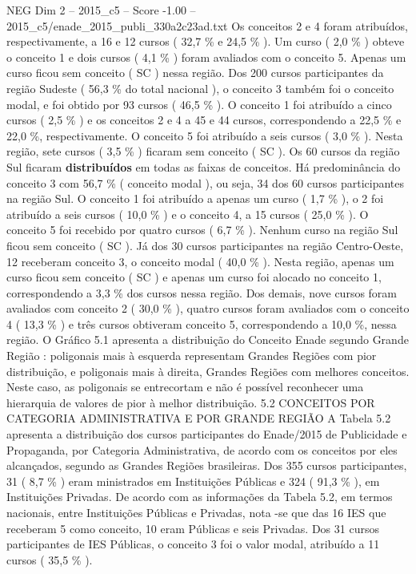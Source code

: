 \begin{textsample}{NEG Dim 2 – 2015\_c5 – Score -1.00 – 2015\_c5/enade\_2015\_publi\_330a2c23ad.txt}
Os conceitos 2 e 4 foram atribuídos, respectivamente, a 16 e 12 cursos ( 32,7 \% e 24,5 \% ).
Um curso ( 2,0 \% ) obteve o conceito 1 e dois cursos ( 4,1 \% ) foram avaliados com o conceito 5.
Apenas um curso ficou sem conceito ( SC ) nessa região.
Dos 200 cursos participantes da região Sudeste ( 56,3 \% do total nacional ), o conceito 3 também foi o conceito modal, e foi obtido por 93 cursos ( 46,5 \% ).
O conceito 1 foi atribuído a cinco cursos ( 2,5 \% ) e os conceitos 2 e 4 a 45 e 44 cursos, correspondendo a 22,5 \% e 22,0 \%, respectivamente.
O conceito 5 foi atribuído a seis cursos ( 3,0 \% ).
Nesta região, sete cursos ( 3,5 \% ) ficaram sem conceito ( SC ).
Os 60 cursos da região Sul ficaram \textbf{distribuídos} em todas as faixas de conceitos.
Há predominância do conceito 3 com 56,7 \% ( conceito modal ), ou seja, 34 dos 60 cursos participantes na região Sul.
O conceito 1 foi atribuído a apenas um curso ( 1,7 \% ), o 2 foi atribuído a seis cursos ( 10,0 \% ) e o conceito 4, a 15 cursos ( 25,0 \% ).
O conceito 5 foi recebido por quatro cursos ( 6,7 \% ).
Nenhum curso na região Sul ficou sem conceito ( SC ).
Já dos 30 cursos participantes na região Centro-Oeste, 12 receberam conceito 3, o conceito modal ( 40,0 \% ).
Nesta região, apenas um curso ficou sem conceito ( SC ) e apenas um curso foi alocado no conceito 1, correspondendo a 3,3 \% dos cursos nessa região.
Dos demais, nove cursos foram avaliados com conceito 2 ( 30,0 \% ), quatro cursos foram avaliados com o conceito 4 ( 13,3 \% ) e três cursos obtiveram conceito 5, correspondendo a 10,0 \%, nessa região.
O Gráfico 5.1 apresenta a distribuição do Conceito Enade segundo Grande Região : poligonais mais à esquerda representam Grandes Regiões com pior distribuição, e poligonais mais à direita, Grandes Regiões com melhores conceitos.
Neste caso, as poligonais se entrecortam e não é possível reconhecer uma hierarquia de valores de pior à melhor distribuição. 5.2 CONCEITOS POR CATEGORIA ADMINISTRATIVA E POR GRANDE REGIÃO A Tabela 5.2 apresenta a distribuição dos cursos participantes do Enade/2015 de Publicidade e Propaganda, por Categoria Administrativa, de acordo com os conceitos por eles alcançados, segundo as Grandes Regiões brasileiras.
Dos 355 cursos participantes, 31 ( 8,7 \% ) eram ministrados em Instituições Públicas e 324 ( 91,3 \% ), em Instituições Privadas.
De acordo com as informações da Tabela 5.2, em termos nacionais, entre Instituições Públicas e Privadas, nota -se que das 16 IES que receberam 5 como conceito, 10 eram Públicas e seis Privadas.
Dos 31 cursos participantes de IES Públicas, o conceito 3 foi o valor modal, atribuído a 11 cursos ( 35,5 \% ).

\end{textsample}
